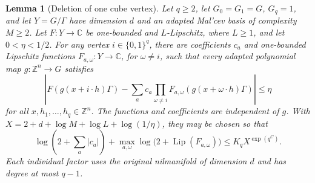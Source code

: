 \documentclass[11pt,a4paper]{article}
\newtheorem{lemma}[theorem]{Lemma}
\theoremstyle{definition}
\newcommand{\Z}{\mathbb Z}
\newcommand{\Lip}{\operatorname{Lip}}
\begin{document}
\begin{lemma}[Deletion of one cube vertex]\label{single:completion}
Let \(q\ge2\), let \(G_0=G_1=G\), \(G_q=1\), and let
\(Y=G/\Gamma\) have dimension \(d\) and an adapted Mal'cev basis of
complexity \(M\ge2\).  Let \(F:Y\to\mathbb C\) be one-bounded and
\(L\)-Lipschitz, where \(L\ge1\), and let \(0<\eta<1/2\).
For any vertex \(i\in\{0,1\}^q\), there are coefficients \(c_a\)
and one-bounded Lipschitz functions \(F_{a,\omega}:Y\to\mathbb C\),
for \(\omega\ne i\), such that every adapted polynomial map
\(g:\Z^n\to G\) satisfies
\begin{equation}\label{single:completion-expansion}
 \left|F(g(x+i\cdot h)\Gamma)
 -\sum_a c_a\prod_{\omega\ne i}
       F_{a,\omega}(g(x+\omega\cdot h)\Gamma)\right|\le\eta
\end{equation}
for all \(x,h_1,\ldots,h_q\in\Z^n\).
The functions and coefficients are independent of \(g\).  With
\(X=2+d+\log M+\log L+\log(1/\eta)\), they may be chosen so that
\begin{equation}\label{single:completion-budget}
 \log\!\left(2+\sum_a|c_a|\right)
 +\max_{a,\omega}\log\bigl(2+\Lip(F_{a,\omega})\bigr)
 \le K_qX^{\exp(q^C)}.
\end{equation}
Each individual factor uses the original nilmanifold of dimension
\(d\) and has degree at most \(q-1\).
\end{lemma}
\end{document}
